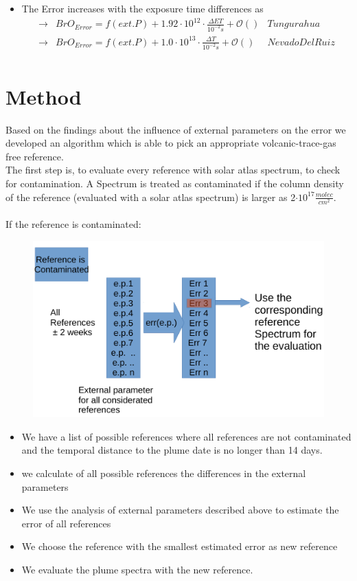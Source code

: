 \documentclass  [
  paper    = a4,
  BCOR     = 10mm,
  twoside,
  fontsize = 12pt,
  fleqn,
  toc      = bibnumbered,
  toc      = listofnumbered,
  numbers  = noendperiod,
  headings = normal,
  listof   = leveldown,
  version  = 3.03
]                                       {scrreprt}
\begin{document}
	\begin{itemize}
		\item The  Error increases with the exposure time differences as\\
		\begin{align*}
		\rightarrow&  BrO_{Error} = f(ext. P)+ 1.92\cdot10^{12}\cdot\frac{\Delta ET}{10^{-2}s} + \mathcal{O}\left(\right) & Tungurahua\\
		\rightarrow&  BrO_{Error} = f(ext. P)+ 1.0\cdot10^{13}\cdot\frac{\Delta T}{10^{-2}s} + \mathcal{O}\left(\right) & Nevado Del Ruiz\\
		\end{align*}
	\end{itemize}
	\chapter{Method}
	Based on the findings about the influence of external parameters on the  error we developed an algorithm which is able to pick an appropriate volcanic-trace-gas free reference.\\ 
	The first step is, to evaluate every reference with solar atlas spectrum, to check for contamination.	A Spectrum is treated as contaminated if the  column density of the reference (evaluated with a solar atlas spectrum) is larger as 2$\cdot 10^{17}\frac{molec}{cm^2}$.\\
	\\
	If the reference is contaminated:
	\begin{figure}
\centering
\includegraphics[width=0.7\linewidth]{Bilder/Cont}
\caption{}
\label{fig:Cont}
\end{figure}

	\begin{itemize}
		\item We have a list of possible references where all references are not contaminated and the temporal distance to the plume date is no longer than 14 days.
		\item we calculate of all possible references the differences in the external parameters
		\item We use the analysis of external parameters described above to estimate the  error of all references
		\item We choose the reference with the smallest estimated  error as new reference
		\item We evaluate the plume spectra with the new reference.
	\end{itemize}
\end{document}
